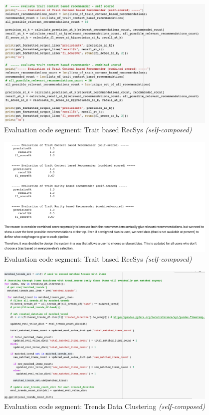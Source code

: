 \begin{figure}[h!]
\centering
\includegraphics[width=0.95\textwidth]{images/appendix/Implementation-test-eval/trait-content-eval-code.png}
\caption{Evaluation code segment: Trait based RecSys \textit{(self-composed)}}
\end{figure}

\begin{figure}[h!]
\centering
\includegraphics[width=0.95\textwidth]{images/appendix/Implementation-test-eval/trait-eval-output.png}
\caption{Evaluation code segment: Trait based RecSys \textit{(self-composed)}}
\end{figure}

\begin{figure}[h!]
\centering
\includegraphics[width=0.95\textwidth]{images/appendix/Implementation-test-eval/trends-eval-data-clustering.png}
\caption{Evaluation code segment: Trends Data Clustering \textit{(self-composed)}}
\end{figure}


